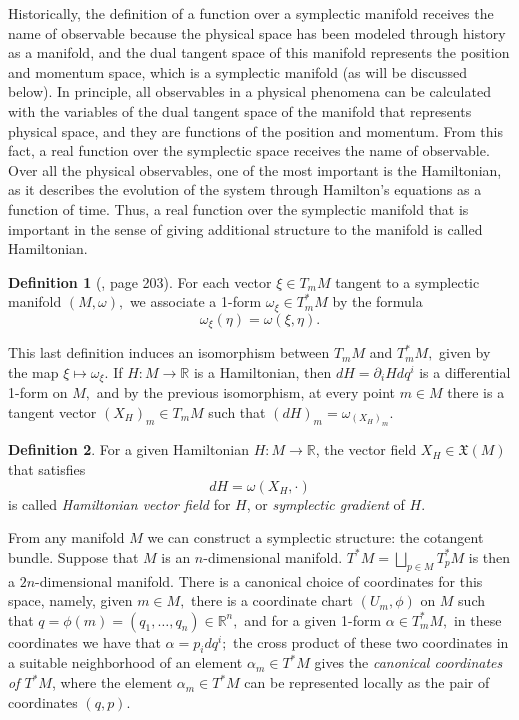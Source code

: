 \documentclass[12pt, letterpaper, reqno]{amsart}
\theoremstyle{definition}
\newtheorem{df}{Definition}
\theoremstyle{plain}
\theoremstyle{remark}
\begin{document}
Historically, the definition of a function over a symplectic manifold receives the name of observable because the physical space has been modeled through history as a manifold, and the dual tangent space of this manifold represents the position and momentum space, which is a symplectic manifold (as will be discussed below). In principle, all observables in a physical phenomena can be calculated with the variables of the dual tangent space of the manifold that represents physical space, and they are functions of the position and momentum. From this fact, a real function over the symplectic space receives the name of observable. Over all the physical observables, one of the most important is the Hamiltonian, as it describes the evolution of the system through Hamilton's equations as a function of time. Thus, a real function over the symplectic manifold that is important in the sense of giving additional structure to the manifold is called Hamiltonian.

\begin{df}[\cite{arnol2013mathematical}, page 203]
	For each vector $ \xi\in T_mM  $ tangent to a symplectic manifold $ (M,\omega), $ we associate a 1-form $ \omega_\xi\in T^*_mM $ by the formula $$ \omega_\xi(\eta)=\omega(\xi,\eta). $$  
\end{df}

This last definition induces an isomorphism between $ T_mM $ and $ T^*_mM, $ given by the map $ \xi \mapsto \omega_\xi. $ If $ H: M \rightarrow \mathbb{R} $ is a Hamiltonian, then $ dH = \partial_i H dq^i $ is a differential 1-form on $ M, $ and by the previous isomorphism, at every point $ m\in M $ there is a tangent vector $ (X_H)_m \in T_mM $ such that $ (dH)_m = \omega_{(X_H)_m}. $ 

\begin{df}
	For a given Hamiltonian $ H: M \rightarrow \mathbb{R} $, the vector field $ X_H\in \mathfrak{X}(M) $ that satisfies $$ dH = \omega(X_H, \cdot) $$ is called \textit{Hamiltonian vector field} for $ H $, or \textit{symplectic gradient} of $ H. $ 
\end{df}

From any manifold $ M $ we can construct a symplectic structure: the cotangent bundle. Suppose that $ M $ is an $ n$-dimensional manifold. $ T^*M= \bigsqcup_{p\in M} T^*_p M$ is then a $ 2n $-dimensional manifold. There is a canonical choice of coordinates for this space, namely, given $ m\in M, $ there is a coordinate chart $ (U_m,\phi) $ on $ M $ such that $ q=\phi(m)=(q_1,\dots,q_n)\in \mathbb{R}^n, $ and for a given 1-form $ \alpha\in T_m^*M,$ in these coordinates we have that $ \alpha=p_i dq^i; $ the cross product of these two coordinates in a suitable neighborhood of an element $ \alpha_m\in T^*M $ gives the \textit{canonical coordinates of $ T^*M $}, where the element $ \alpha_m\in T^*M $ can be represented locally as the pair of coordinates $ (q,p). $      
\end{document}
